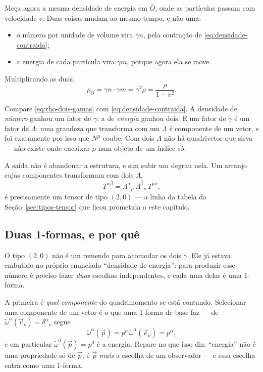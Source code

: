 \documentclass[12pt,a4paper,oneside]{book}
\theoremstyle{rgplain}
\theoremstyle{rgremark}
\begin{document}
Meça agora a mesma densidade de energia em $\bar O$, onde as partículas passam
com velocidade $v$. Duas coisas mudam ao mesmo tempo, e não uma:

\begin{itemize}
  \item o número por unidade de volume vira $\gamma n$, pela contração de
  \eqref{eq:densidade-contraida};
  \item a energia de cada partícula vira $\gamma m$, porque agora ela se move.
\end{itemize}

\noindent Multiplicando as duas,
\begin{equation}
  \rho_{\bar O}=\gamma n\cdot\gamma m=\gamma^2\rho=\frac{\rho}{1-v^2} .
  \label{eq:rho-dois-gamas}
\end{equation}

\begin{atencao}[title={\sffamily\bfseries\footnotesize\color{rgTerracota}CONTE OS FATORES DE $\gamma$}]
Compare \eqref{eq:rho-dois-gamas} com \eqref{eq:densidade-contraida}. A
densidade de \emph{número} ganhou um fator de $\gamma$; a de \emph{energia}
ganhou dois. E um fator de $\gamma$ é um fator de $\Lambda$: uma grandeza que
transforma com um $\Lambda$ é componente de um vetor, e foi exatamente por
isso que $N^\mu$ coube. Com dois $\Lambda$ não há quadrivetor que sirva ---
não existe onde encaixar $\rho$ num objeto de um índice só.
\end{atencao}

A saída não é abandonar a estrutura, e sim subir um degrau nela. Um arranjo
cujas componentes transformam com dois $\Lambda$,
\[
  T^{\bar\alpha\bar\beta}
  =\Lambda^{\bar\alpha}{}_{\mu}\,\Lambda^{\bar\beta}{}_{\nu}\,T^{\mu\nu} ,
\]
é precisamente um tensor de tipo $(2,0)$ --- a linha da tabela da
Seção~\ref{sec:tipos-tensor} que ficou prometida a este capítulo.

\subsection*{Duas 1-formas, e por quê}

O tipo $(2,0)$ não é um remendo para acomodar os dois $\gamma$. Ele já estava
embutido no próprio enunciado ``densidade de energia'': para produzir esse
número é preciso fazer \emph{duas} escolhas independentes, e cada uma delas é
uma 1-forma.

A primeira é \emph{qual componente} do quadrimomento se está contando.
Selecionar uma componente de um vetor é o que uma 1-forma de base faz --- de
$\tilde\omega^\alpha(\vec e_\nu)=\delta^\alpha{}_\nu$ segue
\[
  \tilde\omega^\alpha(\vec p)
  =p^\nu\,\tilde\omega^\alpha(\vec e_\nu)=p^\alpha ,
\]
e em particular $\tilde\omega^0(\vec p)=p^0$ é a energia. Repare no que isso
diz: ``energia'' não é uma propriedade só de $\vec p$; é $\vec p$
\emph{mais} a escolha de um observador --- e essa escolha entra como uma
1-forma.
\end{document}
